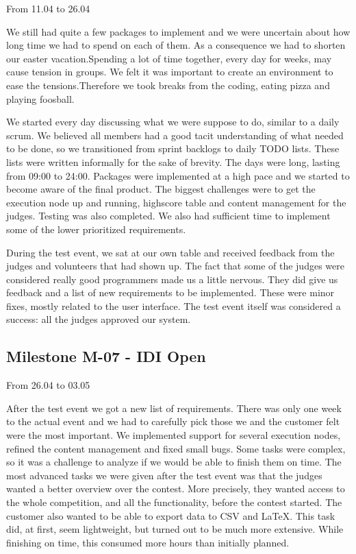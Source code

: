 From 11.04 to 26.04

We still had quite a few packages to implement and we were uncertain
about how long time we had to spend on each of them. As a consequence
we had to shorten our easter vacation.Spending a lot of time together,
every day for weeks, may cause tension in groups. We felt it was
important to create an environment to ease the tensions.Therefore we
took breaks from the coding, eating pizza and playing foosball. 


\bigskip

We started every day discussing what we were suppose to do, similar to a
daily scrum. We believed all members had a good tacit understanding of
what needed to be done, so we transitioned from sprint backlogs to
daily TODO lists. These lists were written informally for the sake of
brevity.\newline
\newline
The days were long, lasting from 09:00 to 24:00. Packages were
implemented at a high pace and we started to become aware of the final
product. The biggest challenges were to get the execution node up and
running, highscore table and content management for the judges. Testing
was also completed. We also had sufficient time to implement some of
the lower prioritized requirements. 


\bigskip

During the test event, we sat at our own table and received feedback
from the judges and volunteers that had shown up. The fact that some of
the judges were considered really good programmers made us a little
nervous. They did give us feedback and a list of new requirements to be
implemented. These were minor fixes, mostly related to the user
interface. The test event itself was considered a success: all the
judges approved our system.


\bigskip

\subsection{Milestone M-07 - IDI Open}

From 26.04 to 03.05

After the test event we got a new list of requirements. There was only
one week to the actual event and we had to carefully pick those we and
the customer felt were the most important. We implemented support for
several execution nodes, refined the content management and fixed small
bugs. Some tasks were complex, so it was a challenge to analyze if we
would be able to finish them on time. The most advanced tasks we were
given after the test event was that the judges wanted a better overview
over the contest. More precisely, they wanted access to the whole
competition, and all the functionality, before the contest started. The
customer also wanted to be able to export data to CSV and LaTeX. This
task did, at first, seem lightweight, but turned out to be much more
extensive. While finishing on time, this consumed more hours than
initially planned.


